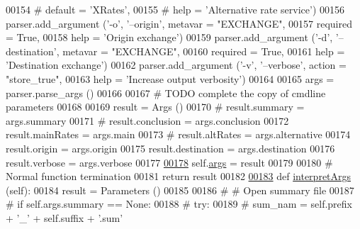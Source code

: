 \begin{DoxyCode}
{00154 \textcolor{comment}{#                             default = 'XRates',}
00155 \textcolor{comment}{#                             help = 'Alternative rate service')}
00156         parser.add\_argument (\textcolor{stringliteral}{'-o'}, \textcolor{stringliteral}{'--origin'}, metavar = \textcolor{stringliteral}{"EXCHANGE"},
00157                              required = \textcolor{keyword}{True},
00158                              help = \textcolor{stringliteral}{'Origin exchange'})
00159         parser.add\_argument (\textcolor{stringliteral}{'-d'}, \textcolor{stringliteral}{'--destination'}, metavar = \textcolor{stringliteral}{"EXCHANGE"},
00160                              required = \textcolor{keyword}{True},
00161                              help = \textcolor{stringliteral}{'Destination exchange'})
00162         parser.add\_argument (\textcolor{stringliteral}{'-v'}, \textcolor{stringliteral}{'--verbose'}, action = \textcolor{stringliteral}{"store\_true"},
00163                              help = \textcolor{stringliteral}{'Increase output verbosity'})
00164                              
00165         args = parser.parse\_args ()
00166         
00167         \textcolor{comment}{# TODO complete the copy of cmdline parameters}
00168         
00169         result = Args ()
00170 \textcolor{comment}{#        result.summary     = args.summary }
00171 \textcolor{comment}{#        result.conclusion  = args.conclusion }
00172         result.mainRates   = args.main 
00173 \textcolor{comment}{#        result.altRates    = args.alternative }
00174         result.origin      = args.origin 
00175         result.destination = args.destination 
00176         result.verbose     = args.verbose
00177         
\hyperlink{classe2e_1_1_application_abade6fc2e2c04ddd7e48137a2a7721bd}{00178}         self.\hyperlink{classe2e_1_1_application_abade6fc2e2c04ddd7e48137a2a7721bd}{args} = result
00179         
00180         \textcolor{comment}{# Normal function termination}
00181         \textcolor{keywordflow}{return} result
00182         
\hyperlink{classe2e_1_1_application_ae7b9559aa388f8178300fb4d7a9f9257}{00183}     \textcolor{keyword}{def }\hyperlink{classe2e_1_1_application_ae7b9559aa388f8178300fb4d7a9f9257}{interpretArgs} (self):
00184         result = Parameters ()
00185         
00186 \textcolor{comment}{#        # Open summary file}
00187 \textcolor{comment}{#        if self.args.summary == None:}
00188 \textcolor{comment}{#            try:}
00189 \textcolor{comment}{#                sum\_nam =  self.prefix + '\_' + self.suffix + '.sum'}
}
\end{DoxyCode}
